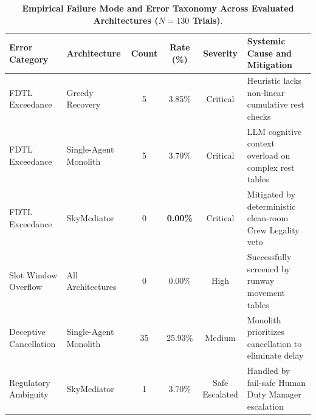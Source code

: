 \begin{table}[htbp]
\centering
\small
\caption{\textbf{Empirical Failure Mode and Error Taxonomy Across Evaluated Architectures ($N=130$ Trials)}.}
\label{tab:failure_taxonomy}
\begin{tabular}{@{}llcccl@{}}
\toprule
\textbf{Error Category} & \textbf{Architecture} & \textbf{Count} & \textbf{Rate (\%)} & \textbf{Severity} & \textbf{Systemic Cause and Mitigation} \\
\midrule
FDTL Exceedance & Greedy Recovery & 5 & 3.85\% & Critical & Heuristic lacks non-linear cumulative rest checks \\
FDTL Exceedance & Single-Agent Monolith & 5 & 3.70\% & Critical & LLM cognitive context overload on complex rest tables \\
FDTL Exceedance & SkyMediator & 0 & \textbf{0.00\%} & Critical & Mitigated by deterministic clean-room Crew Legality veto \\
Slot Window Overflow & All Architectures & 0 & 0.00\% & High & Successfully screened by runway movement tables \\
Deceptive Cancellation & Single-Agent Monolith & 35 & 25.93\% & Medium & Monolith prioritizes cancellation to eliminate delay \\
Regulatory Ambiguity & SkyMediator & 1 & 3.70\% & Safe Escalated & Handled by fail-safe Human Duty Manager escalation \\
\bottomrule
\end{tabular}
\end{table}

